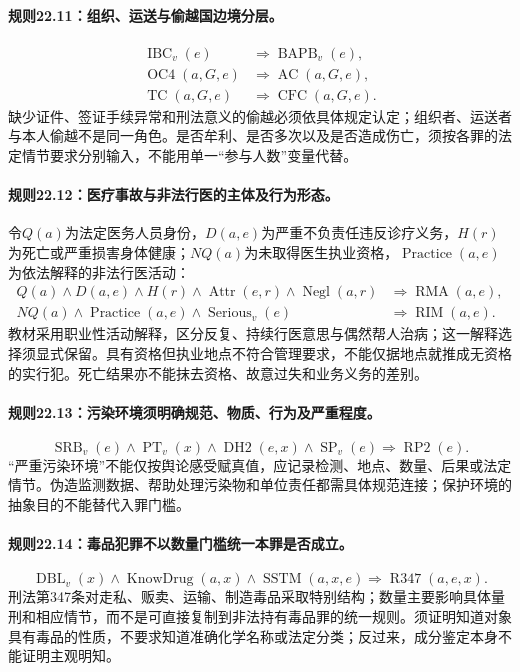 \paragraph{规则22.11：组织、运送与偷越国边境分层。}
\[
\begin{aligned}
\operatorname{IBC}_v(e)&\Rightarrow
\operatorname{BAPB}_v(e),\\
\operatorname{OC4}(a,G,e)&\Rightarrow
\operatorname{AC}(a,G,e),\\
\operatorname{TC}(a,G,e)&\Rightarrow
\operatorname{CFC}(a,G,e).
\end{aligned}
\]
缺少证件、签证手续异常和刑法意义的偷越必须依具体规定认定；组织者、运送者与本人偷越不是同一角色。是否牟利、是否多次以及是否造成伤亡，须按各罪的法定情节要求分别输入，不能用单一“参与人数”变量代替。

\paragraph{规则22.12：医疗事故与非法行医的主体及行为形态。}
令$Q(a)$为法定医务人员身份，$D(a,e)$为严重不负责任违反诊疗义务，$H(r)$为死亡或严重损害身体健康；$NQ(a)$为未取得医生执业资格，$\operatorname{Practice}(a,e)$为依法解释的非法行医活动：
\[
\begin{aligned}
Q(a)\land D(a,e)\land H(r)\land\operatorname{Attr}(e,r)
\land\operatorname{Negl}(a,r)
&\Rightarrow\operatorname{RMA}(a,e),\\
NQ(a)\land\operatorname{Practice}(a,e)\land\operatorname{Serious}_v(e)
&\Rightarrow\operatorname{RIM}(a,e).
\end{aligned}
\]
教材采用职业性活动解释，区分反复、持续行医意思与偶然帮人治病；这一解释选择须显式保留。具有资格但执业地点不符合管理要求，不能仅据地点就推成无资格的实行犯。死亡结果亦不能抹去资格、故意过失和业务义务的差别。

\paragraph{规则22.13：污染环境须明确规范、物质、行为及严重程度。}
\[
\operatorname{SRB}_v(e)\land
\operatorname{PT}_v(x)\land\operatorname{DH2}(e,x)
\land\operatorname{SP}_v(e)
\Rightarrow\operatorname{RP2}(e).
\]
“严重污染环境”不能仅按舆论感受赋真值，应记录检测、地点、数量、后果或法定情节。伪造监测数据、帮助处理污染物和单位责任都需具体规范连接；保护环境的抽象目的不能替代入罪门槛。

\paragraph{规则22.14：毒品犯罪不以数量门槛统一本罪是否成立。}
\[
\operatorname{DBL}_v(x)\land\operatorname{KnowDrug}(a,x)
\land\operatorname{SSTM}(a,x,e)
\Rightarrow\operatorname{R347}(a,e,x).
\]
刑法第347条对走私、贩卖、运输、制造毒品采取特别结构；数量主要影响具体量刑和相应情节，而不是可直接复制到非法持有毒品罪的统一规则。须证明知道对象具有毒品的性质，不要求知道准确化学名称或法定分类；反过来，成分鉴定本身不能证明主观明知。

